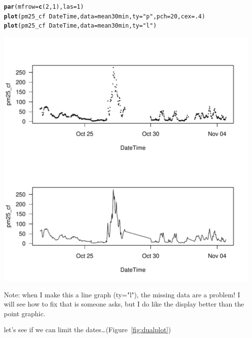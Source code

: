 \documentclass{article}\usepackage[]{graphicx}\usepackage[]{color}
\makeatletter
\def\maxwidth{ %
  \ifdim\Gin@nat@width>\linewidth
    \linewidth
  \else
    \Gin@nat@width
  \fi
}
\newcommand{\hlnum}[1]{\textcolor[rgb]{0.686,0.059,0.569}{#1}}%
\newcommand{\hlstr}[1]{\textcolor[rgb]{0.192,0.494,0.8}{#1}}%
\newcommand{\hlopt}[1]{\textcolor[rgb]{0,0,0}{#1}}%
\newcommand{\hlstd}[1]{\textcolor[rgb]{0.345,0.345,0.345}{#1}}%
\newcommand{\hlkwc}[1]{\textcolor[rgb]{0.333,0.667,0.333}{#1}}%
\newcommand{\hlkwd}[1]{\textcolor[rgb]{0.737,0.353,0.396}{\textbf{#1}}}%
\newenvironment{kframe}{%
 \def\at@end@of@kframe{}%
 \ifinner\ifhmode%
  \def\at@end@of@kframe{\end{minipage}}%
  \begin{minipage}{\columnwidth}%
 \fi\fi%
 \def\FrameCommand##1{\hskip\@totalleftmargin \hskip-\fboxsep
 \colorbox{shadecolor}{##1}\hskip-\fboxsep
     \hskip-\linewidth \hskip-\@totalleftmargin \hskip\columnwidth}%
 \MakeFramed {\advance\hsize-\width
   \@totalleftmargin\z@ \linewidth\hsize
   \@setminipage}}%
 {\par\unskip\endMakeFramed%
 \at@end@of@kframe}
\newenvironment{knitrout}{}{} %
\def\maxwidth{ %
  \ifdim\Gin@nat@width>\linewidth
    \linewidth
  \else
    \Gin@nat@width
  \fi
}
\makeatother
\begin{document}
\begin{knitrout}
\color{fgcolor}\begin{kframe}
\begin{alltt}
\hlkwd{par}\hlstd{(}\hlkwc{mfrow}\hlstd{=}\hlkwd{c}\hlstd{(}\hlnum{2}\hlstd{,}\hlnum{1}\hlstd{),} \hlkwc{las}\hlstd{=}\hlnum{1}\hlstd{)}
\hlkwd{plot}\hlstd{(pm25_cf} \hlopt{~} \hlstd{DateTime,} \hlkwc{data}\hlstd{=mean30min,} \hlkwc{ty}\hlstd{=}\hlstr{"p"}\hlstd{,} \hlkwc{pch}\hlstd{=}\hlnum{20}\hlstd{,} \hlkwc{cex}\hlstd{=}\hlnum{.4}\hlstd{)}
\hlkwd{plot}\hlstd{(pm25_cf} \hlopt{~} \hlstd{DateTime,} \hlkwc{data}\hlstd{=mean30min,} \hlkwc{ty}\hlstd{=}\hlstr{"l"}\hlstd{)}
\end{alltt}
\end{kframe}
\includegraphics[width=\maxwidth]{figure/unnamed-chunk-19-1} 

\end{knitrout}

Note: when I make this a line graph (ty="l"), the missing data are a problem!  I will see how to fix that is someone asks, but I do like the display better than the point graphic.

let's see if we can limit the dates\ldots (Figure~\ref{fig:dualplot})
\end{document}
